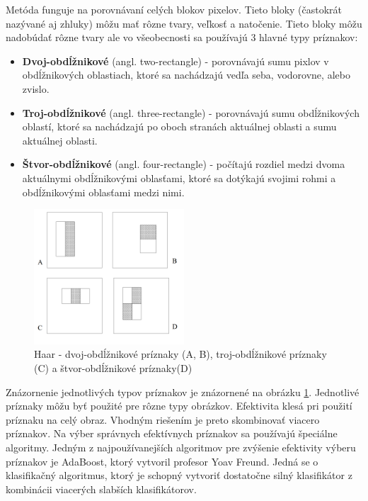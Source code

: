 \documentclass[slovak,master,dept460,male,cpp,cpdeclaration]{diploma}
\begin{document}
 Metóda funguje na porovnávaní celých blokov pixelov. Tieto bloky (častokrát nazývané aj zhluky) môžu mať rôzne tvary, veľkosť a natočenie. Tieto bloky môžu nadobúdať rôzne tvary ale vo všeobecnosti sa používajú 3 hlavné typy príznakov:
\begin{itemize}
  \item \textbf{Dvoj-obdĺžnikové} (angl. two-rectangle) - porovnávajú sumu pixlov v obdĺžnikových oblastiach, ktoré sa nachádzajú vedľa seba, vodorovne, alebo zvislo.
  \item \textbf{Troj-obdĺžnikové} (angl. three-rectangle) - porovnávajú sumu obdĺžnikových oblastí, ktoré sa nachádzajú po oboch stranách aktuálnej oblasti a sumu aktuálnej oblasti.
  \item \textbf{Štvor-obdĺžnikové} (angl. four-rectangle) - počítajú rozdiel medzi dvoma aktuálnymi obdĺžnikovými oblasťami, ktoré sa dotýkajú svojimi rohmi a obdĺžnikovými oblasťami medzi nimi.
  
 \end{itemize}
   \begin{figure}[H]
	\centering
	\includegraphics[width=0.5\textwidth]{Figures/haar1.png}
	\caption{Haar - dvoj-obdĺžnikové príznaky (A, B), troj-obdĺžnikové príznaky (C) a štvor-obdĺžnikové príznaky(D)\cite{viola2001robust}}
	\label{fig:Haar1}
\end{figure}
  Znázornenie jednotlivých typov príznakov je znázornené na obrázku \ref{fig:Haar1}. Jednotlivé príznaky môžu byť použité pre rôzne typy obrázkov. Efektivita klesá pri použití príznaku na celý obraz. Vhodným riešením je preto skombinovať viacero príznakov. Na výber  správnych efektívnych príznakov sa používajú špeciálne algoritmy. Jedným z najpoužívanejších algoritmov  pre zvýšenie efektivity výberu príznakov je AdaBoost\cite{freund1995desicion}, ktorý vytvoril profesor Yoav Freund. Jedná se o klasifikačný algoritmus, ktorý je schopný vytvoriť dostatočne silný klasifikátor z kombinácii viacerých slabších klasifikátorov. 
\end{document}
